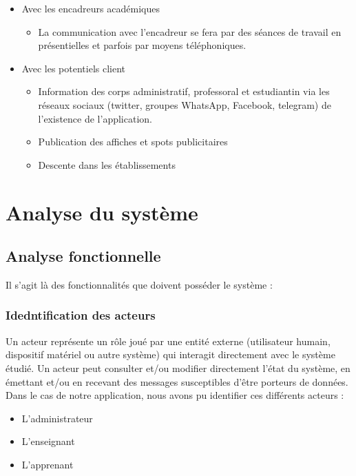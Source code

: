 \begin{itemize}
	\item Avec les encadreurs académiques
	      \begin{itemize}
		      \item La communication avec l’encadreur se fera par des séances de travail en présentielles et parfois par moyens téléphoniques.
	      \end{itemize}
	\item Avec les potentiels client
	      \begin{itemize}
		      \item Information des corps administratif, professoral et estudiantin via les réseaux sociaux (twitter, groupes WhatsApp, Facebook, telegram) de l’existence de l’application.
		      \item Publication des affiches et spots publicitaires
		      \item Descente dans les établissements
	      \end{itemize}
\end{itemize}

\section{Analyse du système}

\subsection{Analyse fonctionnelle} %
\label{sub:analyse-fonctionnelle}

Il s’agit là des fonctionnalités que doivent posséder le système :

\subsubsection{Idedntification des acteurs} %
\label{ssub:Idedntification-des-acteurs}


Un acteur représente un rôle joué par une entité externe (utilisateur humain, dispositif matériel ou autre système) qui interagit directement avec le système étudié. Un acteur peut consulter et/ou modifier directement l’état du système, en émettant et/ou en recevant des messages susceptibles d’être porteurs de données. Dans le cas de notre application, nous avons pu identifier ces différents acteurs :

\begin{itemize}
	\item L’administrateur
	\item L’enseignant
	\item L’apprenant
\end{itemize}

